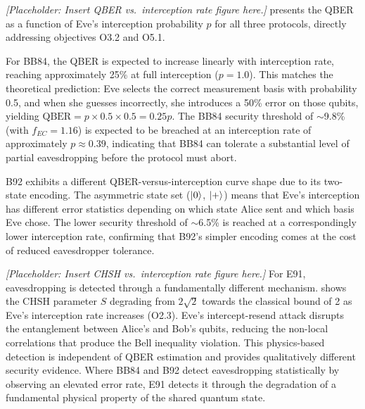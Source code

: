\documentclass[10pt, a4paper]{report}
\begin{document}
\textit{[Placeholder: Insert QBER vs.\ interception rate figure here.]}  presents the QBER as a function of Eve's interception probability $p$ for all three protocols, directly addressing objectives O3.2 and O5.1.

For BB84, the QBER is expected to increase linearly with interception rate, reaching approximately 25\% at full interception ($p = 1.0$). This matches the theoretical prediction: Eve selects the correct measurement basis with probability 0.5, and when she guesses incorrectly, she introduces a 50\% error on those qubits, yielding $\text{QBER} = p \times 0.5 \times 0.5 = 0.25p$. The BB84 security threshold of $\sim$9.8\% (with $f_{EC} = 1.16$) is expected to be breached at an interception rate of approximately $p \approx 0.39$, indicating that BB84 can tolerate a substantial level of partial eavesdropping before the protocol must abort.

B92 exhibits a different QBER-versus-interception curve shape due to its two-state encoding. The asymmetric state set ($\ket{0}$, $\ket{+}$) means that Eve's interception has different error statistics depending on which state Alice sent and which basis Eve chose. The lower security threshold of $\sim$6.5\% is reached at a correspondingly lower interception rate, confirming that B92's simpler encoding comes at the cost of reduced eavesdropper tolerance.


\textit{[Placeholder: Insert CHSH vs.\ interception rate figure here.]} For E91, eavesdropping is detected through a fundamentally different mechanism.  shows the CHSH parameter $S$ degrading from $2\sqrt{2}$ towards the classical bound of 2 as Eve's interception rate increases (O2.3). Eve's intercept-resend attack disrupts the entanglement between Alice's and Bob's qubits, reducing the non-local correlations that produce the Bell inequality violation. This physics-based detection is independent of QBER estimation and provides qualitatively different security evidence. Where BB84 and B92 detect eavesdropping statistically by observing an elevated error rate, E91 detects it through the degradation of a fundamental physical property of the shared quantum state.
\end{document}
